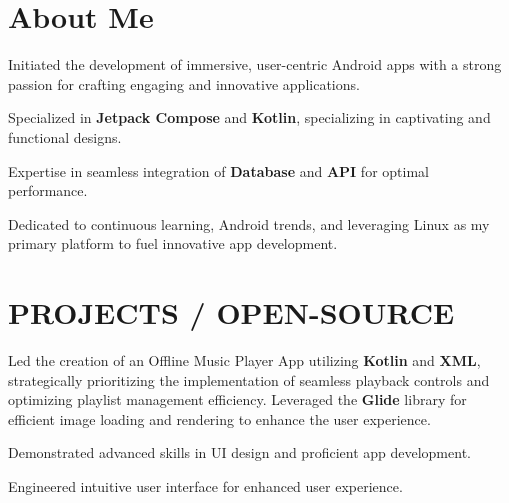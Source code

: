 \documentclass[bold]{deedy-resume-openfont}
\begin{document}
\hfill
\begin{minipage}[t]{0.66\textwidth} 


\section{About Me}
\vspace{\topsep} %
\begin{tightemize}
    \item Initiated the development of immersive, user-centric Android apps with a strong passion for crafting engaging and innovative applications.
    \item Specialized in \textbf{Jetpack Compose} and \textbf{Kotlin}, specializing in captivating and functional designs.
    \item Expertise in seamless integration of \textbf{Database} and \textbf{API} for optimal performance.
    \item Dedicated to continuous learning, Android trends, and leveraging Linux as my primary platform to fuel innovative app development.
\end{tightemize}
\sectionsep



\section*{PROJECTS / OPEN-SOURCE}

\begin{tightemize}
    \item Led the creation of an Offline Music Player App utilizing \textbf{Kotlin} and \textbf{XML}, strategically prioritizing the implementation of seamless playback controls and optimizing playlist management efficiency. Leveraged the \textbf{Glide} library for efficient image loading and rendering to enhance the user experience.
    \item Demonstrated advanced skills in UI design and proficient app development.
    \item Engineered intuitive user interface for enhanced user experience.
\end{tightemize}
\sectionsep


\end{minipage}
\end{document}
